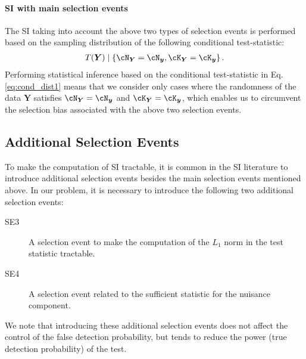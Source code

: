 \paragraph{SI with main selection events}
%
The SI taking into account the above two types of selection events is performed based on the sampling distribution of the following conditional test-statistic: 
\begin{align}
 \label{eq:cond_dist1}
 T(\bm Y) \mid \left\{\cN_{\bm Y} = \cN_{\bm y}, \cK_{\bm Y} = \cK_{\bm y} \right\}.
\end{align}
%
Performing statistical inference based on the conditional test-statistic in Eq.\eqref{eq:cond_dist1} means that we consider only cases where the randomness of the data $\bm Y$ satisfies $\cN_{\bm Y} = \cN_{\bm y}$ and $\cK_{\bm Y} = \cK_{\bm y}$, which enables us to circumvent the selection bias associated with the above two selection events.

\subsection{Additional Selection Events}
%
To make the computation of SI tractable, it is common in the SI literature to introduce additional selection events besides the main selection events mentioned above.
%
In our problem, it is necessary to introduce the following two additional selection events:
%
\begin{description}
 \item[SE3] A selection event to make the computation of the $L_1$ norm in the test statistic tractable.
 \item[SE4] A selection event related to the sufficient statistic for the nuisance component.
\end{description}
%
We note that introducing these additional selection events does not affect the control of the false detection probability, but tends to reduce the power (true detection probability) of the test.

